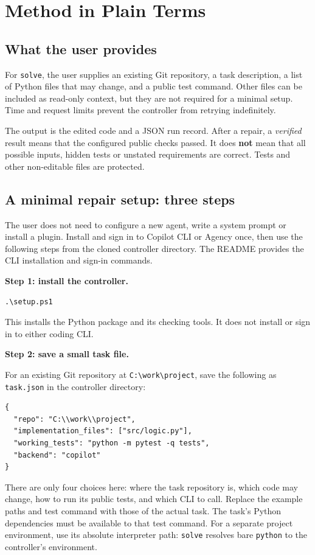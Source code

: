 \documentclass[10pt,twocolumn,a4paper]{article}
\begin{document}
\section{Method in Plain Terms}
\subsection{What the user provides}
For \texttt{solve}, the user supplies an existing Git repository, a task description, a list of
Python files that may change, and a public test command. Other files can be
included as read-only context, but they are not required for a minimal setup.
Time and request limits prevent the controller from retrying indefinitely.

The output is the edited code and a JSON run record. After a repair, a
\emph{verified} result means that the configured public checks passed.
It does \textbf{not} mean that all possible inputs, hidden tests or unstated
requirements are correct. Tests and other non-editable files are protected.

\subsection{A minimal repair setup: three steps}
\label{sec:setup}
The user does not need to configure a new agent, write a system prompt or
install a plugin. Install and sign in to Copilot CLI or Agency once, then
use the following steps from the cloned controller directory. The README
provides the CLI installation and sign-in commands.

\noindent\textbf{Step 1: install the controller.}\par
\begin{lstlisting}
.\setup.ps1
\end{lstlisting}
This installs the Python package and its checking tools. It does not install
or sign in to either coding CLI.

\noindent\textbf{Step 2: save a small task file.}\par
For an existing Git repository at \texttt{C:\textbackslash work\textbackslash project},
save the following as \texttt{task.json} in the controller directory:
\begin{lstlisting}
{
  "repo": "C:\\work\\project",
  "implementation_files": ["src/logic.py"],
  "working_tests": "python -m pytest -q tests",
  "backend": "copilot"
}
\end{lstlisting}
There are only four choices here: where the task repository is, which code
may change, how to run its public tests, and which CLI to call. Replace the
example paths and test command with those of the actual task. The task's
Python dependencies must be available to that test command.
For a separate project environment, use its absolute interpreter path:
\texttt{solve} resolves bare \texttt{python} to the controller's environment.
\end{document}
